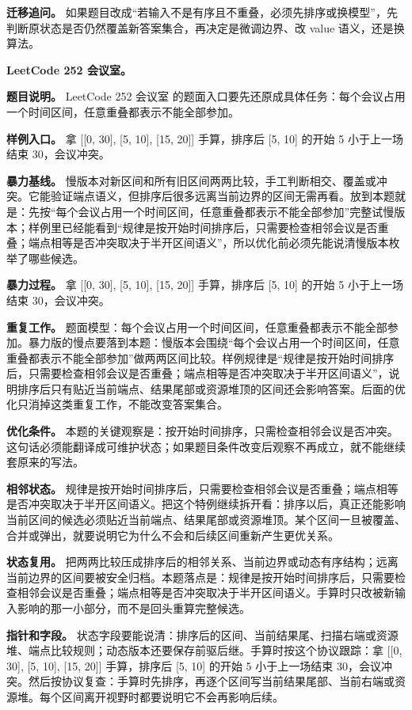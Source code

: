 \textbf{迁移追问。} 如果题目改成“若输入不是有序且不重叠，必须先排序或换模型”，先判断原状态是否仍然覆盖新答案集合，再决定是微调边界、改 value 语义，还是换算法。

\noindent\textbf{LeetCode 252 会议室。}

\textbf{题目说明。} LeetCode 252 会议室 的题面入口要先还原成具体任务：每个会议占用一个时间区间，任意重叠都表示不能全部参加。

\textbf{样例入口。} 拿 [[0, 30], [5, 10], [15, 20]] 手算，排序后 [5, 10] 的开始 5 小于上一场结束 30，会议冲突。

\textbf{暴力基线。} 慢版本对新区间和所有旧区间两两比较，手工判断相交、覆盖或冲突。它能验证端点语义，但排序后很多远离当前边界的区间无需再看。放到本题就是：先按“每个会议占用一个时间区间，任意重叠都表示不能全部参加”完整试慢版本；样例里已经能看到“规律是按开始时间排序后，只需要检查相邻会议是否重叠；端点相等是否冲突取决于半开区间语义”，所以优化前必须先能说清慢版本枚举了哪些候选。

\textbf{暴力过程。} 拿 [[0, 30], [5, 10], [15, 20]] 手算，排序后 [5, 10] 的开始 5 小于上一场结束 30，会议冲突。

\textbf{重复工作。} 题面模型：每个会议占用一个时间区间，任意重叠都表示不能全部参加。暴力版的慢点要落到本题：慢版本会围绕“每个会议占用一个时间区间，任意重叠都表示不能全部参加”做两两区间比较。样例规律是“规律是按开始时间排序后，只需要检查相邻会议是否重叠；端点相等是否冲突取决于半开区间语义”，说明排序后只有贴近当前端点、结果尾部或资源堆顶的区间还会影响答案。后面的优化只消掉这类重复工作，不能改变答案集合。

\textbf{优化条件。} 本题的关键观察是：按开始时间排序，只需检查相邻会议是否冲突。这句话必须能翻译成可维护状态；如果题目条件改变后观察不再成立，就不能继续套原来的写法。

\textbf{相邻状态。} 规律是按开始时间排序后，只需要检查相邻会议是否重叠；端点相等是否冲突取决于半开区间语义。把这个特例继续拆开看：排序以后，真正还能影响当前区间的候选必须贴近当前端点、结果尾部或资源堆顶。某个区间一旦被覆盖、合并或弹出，就要说明它为什么不会和后续区间重新产生更优关系。

\textbf{状态复用。} 把两两比较压成排序后的相邻关系、当前边界或动态有序结构；远离当前边界的区间要被安全归档。本题落点是：规律是按开始时间排序后，只需要检查相邻会议是否重叠；端点相等是否冲突取决于半开区间语义。手算时只改被新输入影响的那一小部分，而不是回头重算完整候选。

\textbf{指针和字段。} 状态字段要能说清：排序后的区间、当前结果尾、扫描右端或资源堆、端点比较规则；动态版本还要保存前驱后继。手算时按这个协议跟踪：拿 [[0, 30], [5, 10], [15, 20]] 手算，排序后 [5, 10] 的开始 5 小于上一场结束 30，会议冲突。然后按协议复查：手算时先排序，再逐个区间写当前结果尾部、当前右端或资源堆。每个区间离开视野时都要说明它不会再影响后续。

